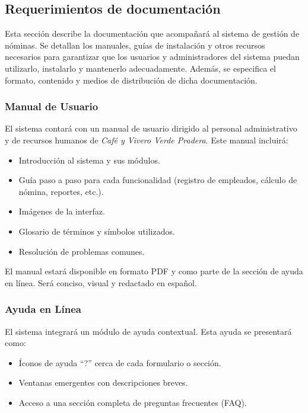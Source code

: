 \subsection*{Requerimientos de documentación}

Esta sección describe la documentación que acompañará al sistema de gestión de nóminas.
Se detallan los manuales, guías de instalación y otros recursos necesarios para garantizar
que los usuarios y administradores del sistema puedan utilizarlo, instalarlo y mantenerlo
adecuadamente. Además, se especifica el formato, contenido y medios de distribución de
dicha documentación.

\subsubsection*{Manual de Usuario}

El sistema contará con un manual de usuario dirigido al personal administrativo y de recursos humanos de \textit{Café y Vivero Verde Pradera}. Este manual incluirá:

\begin{itemize}
	\item Introducción al sistema y sus módulos.
	\item Guía paso a paso para cada funcionalidad (registro de empleados, cálculo de nómina, reportes, etc.).
	\item Imágenes de la interfaz.
	\item Glosario de términos y símbolos utilizados.
	\item Resolución de problemas comunes.
\end{itemize}

El manual estará disponible en formato PDF y como parte de la sección de ayuda en línea. Será conciso, visual y redactado en español.

\subsubsection*{Ayuda en Línea}

El sistema integrará un módulo de ayuda contextual. Esta ayuda se presentará como:

\begin{itemize}
	\item Íconos de ayuda ``?'' cerca de cada formulario o sección.
	\item Ventanas emergentes con descripciones breves.
	\item Acceso a una sección completa de preguntas frecuentes (FAQ).
\end{itemize}

